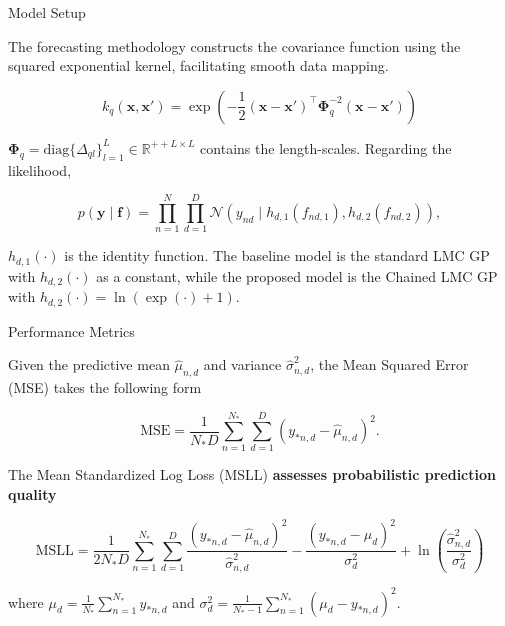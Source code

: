 \begin{frame}{Model Setup}

\begin{block}{}
	The forecasting methodology constructs the covariance function using the squared exponential kernel, facilitating smooth data mapping.
\end{block}


\[
	k_{q}\left(\boldsymbol{x}, \boldsymbol{x}' \right) = \exp\left(-\frac{1}{2}(\boldsymbol{x} - \boldsymbol{x}')^\top \boldsymbol{\Phi}_q^{-2} (\boldsymbol{x} - \boldsymbol{x}')\right)
\]

\begin{block}{}
\( \boldsymbol{\Phi}_q=\text{diag}\{\Delta_{ql}\}_{l=1}^{L} \in \mathbb{R}^{++L \times L} \) contains the length-scales. Regarding the likelihood,
\end{block}

\[
	p(\boldsymbol{y} \mid \boldsymbol{f}) = \prod_{n=1}^{N}\prod_{d=1}^{D} \mathcal{N}\left(y_{nd} \mid h_{d,1}(f_{nd,1}), h_{d,2}(f_{nd,2}) \right),
\]

\begin{block}{}
$h_{d,1}(\cdot)$ is the identity function. The baseline model is the standard LMC GP with $h_{d,2}(\cdot)$ as a constant, while the proposed model is the Chained LMC GP with $h_{d,2}(\cdot) = \ln(\exp(\cdot)+1)$.
\end{block}

\end{frame}


\begin{frame}{Performance Metrics}

\begin{block}{}
	Given the predictive mean \( \hat{\mu}_{n,d}\) and variance \( \hat{\sigma}^2_{n,d}\), the Mean Squared Error (MSE) takes the following form
\end{block}

\[
	\text{MSE} = \frac{1}{N_{*}D} \sum_{n=1}^{N_*} \sum_{d=1}^{D} \left( y_{*n,d} - \hat{\mu}_{n,d} \right)^2.
\]

\begin{block}{}
The Mean Standardized Log Loss (MSLL) \textcolor{BrandTeal}{\textbf{assesses probabilistic prediction quality}}~\cite{RasmussenW06}
\end{block}

\[
	\text{MSLL} = \frac{1}{2N_{*}D} \sum_{n=1}^{N_*} \sum_{d=1}^{D}  \frac{(y_{*n,d} - \hat{\mu}_{n,d} )^2}{\hat{\sigma}^2_{n,d}}
	- \frac{(y_{*n,d} - \mu_d)^2}{\sigma_d^2} + \ln \left(\frac{\hat{\sigma}^2_{n,d}}{\sigma_d^2}\right)
\]

\begin{block}{}
	where \( \mu_d = \frac{1}{N_*} \sum_{n=1}^{N_*} y_{*n,d}\) and \( \sigma_d^2 = \frac{1}{N_* - 1} \sum_{n=1}^{N_*} (\mu_d - y_{*n,d})^2 \).
\end{block}

\end{frame}

